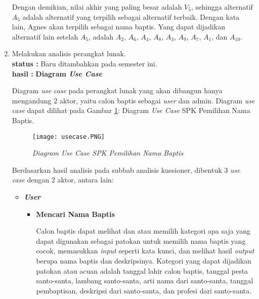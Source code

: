 \documentclass[a4paper,twoside]{article}
\begin{document}
\begin{enumerate}
Dengan demikian, nilai akhir yang paling besar adalah $V_{5}$, sehingga alternatif $A_{5}$ adalah alternatif yang terpilih sebagai alternatif terbaik. Dengan kata lain, Agnes akan terpilih sebagai nama baptis. Yang dapat dijadikan alternatif lain setelah $A_{5}$, adalah $A_{2}$, $A_{6}$, $A_{4}$, $A_{8}$, $A_{3}$, $A_{9}$, $A_{7}$, $A_{1}$, dan $A_{10}$. 


\item Melakukan analisis perangkat lunak.\\
		{\bf status :} Baru ditambahkan pada semester ini.\\
		{\bf hasil :}
\textbf{Diagram \textit{Use Case}}

	Diagram \textit{use case} pada perangkat lunak yang akan dibangun hanya mengandung 2 aktor, yaitu calon baptis sebagai \textit{user} dan admin.  Diagram \textit{use case} dapat dilihat pada Gambar  \ref{fig:usecase}: Diagram \textit{Use Case} SPK Pemilihan Nama Baptis.

	\begin{figure}[htbp]
		\centering
			\texttt{[image: usecase.PNG]}
			\caption{\textit{Diagram \textit{Use Case} SPK Pemilihan Nama Baptis}}
		\label{fig:usecase}
	\end{figure}

	Berdasarkan hasil analisis  pada subbab analisis kuesioner, dibentuk 3 \textit{use case} dengan 2 aktor, antara lain:
	\begin{itemize}
			\item \textbf{\textit{User}}
				\begin{itemize}
					\item \textbf{Mencari Nama Baptis}

					Calon baptis dapat melihat dan atau memilih kategori apa saja yang dapat digunakan sebagai patokan untuk memilih nama baptis yang cocok, memasukkan \textit{input} seperti kata kunci, dan melihat hasil \textit{output} berupa nama baptis dan deskripsinya. Kategori yang dapat dijadikan patokan atau acuan adalah tanggal lahir calon baptis, tanggal pesta santo-santa, lambang santo-santa, arti nama dari santo-santa, tanggal pembaptisan, deskripsi dari santo-santa, dan profesi dari santo-santa.



\end{itemize}
\end{itemize}
\end{enumerate}
\end{document}
